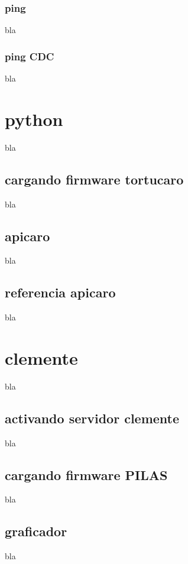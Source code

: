 \documentclass[letterpaper,10pt,english]{sphinxmanual}
\begin{document}
\subsection{ping}
\label{ejemplos:ping}
bla


\subsection{ping CDC}
\label{ejemplos:ping-cdc}
bla


\chapter{python}
\label{python:python}\label{python::doc}
bla


\section{cargando firmware tortucaro}
\label{python:cargando-firmware-tortucaro}
bla


\section{apicaro}
\label{python:apicaro}
bla


\section{referencia apicaro}
\label{python:referencia-apicaro}
bla


\chapter{clemente}
\label{clemente:clemente}\label{clemente::doc}
bla


\section{activando servidor clemente}
\label{clemente:activando-servidor-clemente}
bla


\section{cargando firmware PILAS}
\label{clemente:cargando-firmware-pilas}
bla


\section{graficador}
\label{clemente:graficador}
bla



\renewcommand{\indexname}{Index}
\printindex
\end{document}
